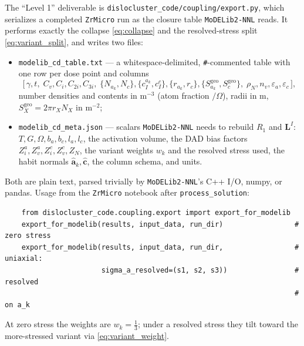 \documentclass[11pt]{article}
\newcommand{\eps}{\varepsilon}
\newcommand{\Oh}{\Omega}
\newcommand{\ZrMicro}{\texttt{ZrMicro}}
\newcommand{\MoDELib}{\texttt{MoDELib2-NNL}}
\newcommand{\code}[1]{\texttt{#1}}
\begin{document}
The ``Level 1'' deliverable is \code{dislocluster\_code/coupling/export.py}, which
serializes a completed \ZrMicro{} run as the closure table \MoDELib{} reads. It
performs exactly the collapse \eqref{eq:collapse} and the resolved-stress split
\eqref{eq:variant_split}, and writes two files:
\begin{itemize}[leftmargin=1.4em,topsep=2pt,itemsep=1pt]
\item \code{modelib\_cd\_table.txt} --- a whitespace-delimited, \code{\#}-commented
table with one row per dose point and columns
\[
\big[\,\gamma,t,\;C_v,C_i,C_{2i},C_{3i},\;
\{N_{a_k},N_c\},\{c^{a_k}_I,c^{c}_I\},\{r_{a_k},r_c\},
\{S^{\mathrm{geo}}_{a_k},S^{\mathrm{geo}}_c\},\;\rho_N,n_v,\eps_a,\eps_c\,\big],
\]
number densities and contents in $\mathrm{m^{-3}}$ (atom fraction $/\Oh$), radii
in m, $S^{\mathrm{geo}}_X=2\pi r_X N_X$ in $\mathrm{m^{-2}}$;
\item \code{modelib\_cd\_meta.json} --- scalars \MoDELib{} needs to rebuild $R_1$
and $\mathbf L^I$: $T,G,\Oh,b_a,b_c,l_a,l_c$, the activation volume, the DAD bias
factors $Z_i^a,Z_v^a,Z_i^c,Z_v^c,Z_N$, the variant weights $w_k$ and the resolved
stress used, the habit normals $\hat{\mathbf a}_k,\hat{\mathbf c}$, the column
schema, and units.
\end{itemize}
Both are plain text, parsed trivially by \MoDELib{}'s C++ I/O, numpy, or pandas.
Usage from the \ZrMicro{} notebook after \code{process\_solution}:
\begin{verbatim}
    from dislocluster_code.coupling.export import export_for_modelib
    export_for_modelib(results, input_data, run_dir)                 # zero stress
    export_for_modelib(results, input_data, run_dir,                 # uniaxial:
                       sigma_a_resolved=(s1, s2, s3))                #  resolved
                                                                     #  on a_k
\end{verbatim}
At zero stress the weights are $w_k=\tfrac13$; under a resolved stress they tilt
toward the more-stressed variant via \eqref{eq:variant_weight}.
\end{document}
